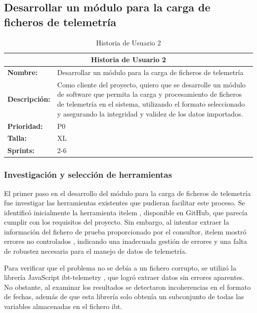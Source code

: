 \subsection{Desarrollar un módulo para la carga de ficheros de telemetría}
\begin{table}[H]
\centering
\begin{tabular}{|l|p{10cm}|}
\hline
\multicolumn{2}{|c|}{\textbf{Historia de Usuario 2}} \\ \hline
\textbf{Nombre:} & Desarrollar un módulo para la carga de ficheros de telemetría \\ \hline
\textbf{Descripción:} & Como cliente del proyecto, quiero que se desarrolle un módulo de software que permita la carga y procesamiento de ficheros de telemetría en el sistema, utilizando el formato seleccionado y asegurando la integridad y validez de los datos importados. \\ \hline
\textbf{Prioridad:} & P0 \\ \hline
\textbf{Talla:} & XL \\ \hline
\textbf{Sprints:} & 2-6 \\ \hline
\end{tabular}
\caption{Historia de Usuario 2}
\label{tab:us_carga_telemetria}
\end{table}

\subsubsection*{Investigación y selección de herramientas}
El primer paso en el desarrollo del módulo para la carga de ficheros de telemetría fue investigar las herramientas existentes que pudieran facilitar este proceso. Se identificó inicialmente la herramienta itelem \cite{itelem}, disponible en GitHub, que parecía cumplir con los requisitos del proyecto. Sin embargo, al intentar extraer la información del fichero de prueba proporcionado por el consultor, itelem mostró errores no controlados \cite{rust_panic_2023}, indicando una inadecuada gestión de errores y una falta de robustez necesaria para el manejo de datos de telemetría.

Para verificar que el problema no se debía a un fichero corrupto, se utilizó la librería JavaScript ibt-telemetry \cite{ibt-telemetry}, que logró extraer datos sin errores aparentes. No obstante, al examinar los resultados se detectaron incoherencias en el formato de fechas, además de que esta librería solo obtenía un subconjunto de todas las variables almacenadas en el fichero \ac{ibt}.

